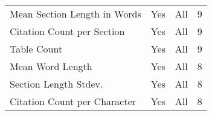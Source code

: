 \begin{table}[htbp]
\begin{tabular}{m{} c c c}
        Mean Section Length in Words & Yes & All & 9 \\
        Citation Count per Section & Yes & All & 9 \\
        Table Count & Yes & All & 9 \\
        Mean Word Length & Yes & All & 8 \\
        Section Length Stdev. & Yes & All & 8 \\
        Citation Count per Character & Yes & All & 8 \\
        \bottomrule
    \end{tabular}
\end{table}